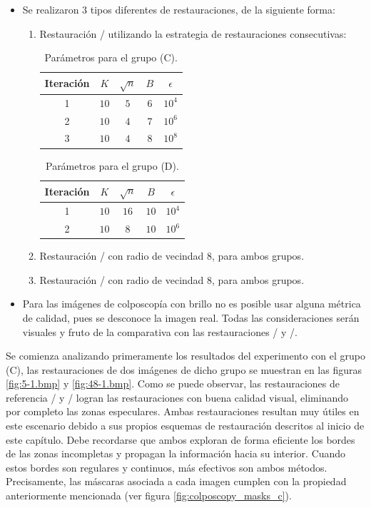 \begin{itemize}
	\item Se realizaron 3 tipos diferentes de restauraciones, de la siguiente forma:
	\begin{enumerate}
		\item Restauraci\'on \SOP/ utilizando la estrategia de restauraciones consecutivas:
		\begin{table}[H]
			\centering
			\begin{tabular}{|c|cccc|}
				\hline
				Iteraci\'on & $K$ & $\sqrt{n}$ & $B$ & $\epsilon$ \\\hline
				1 & $10$ & $5$ & $6$ & $10^4$\\
				2 & $10$ & $4$ & $7$ & $10^6$\\
				3 & $10$ & $4$ & $8$ & $10^8$\\\hline
			\end{tabular}
			\caption{Par\'ametros para el grupo (C).}
			\label{tab:params_c}
		\end{table}
		\begin{table}[H]
			\centering
			\begin{tabular}{|c|cccc|}
				\hline
				Iteraci\'on & $K$ & $\sqrt{n}$ & $B$ & $\epsilon$ \\\hline
				1 & $10$ & $16$ & $10$ & $10^4$\\
				2 & $10$ & $8$ & $10$ & $10^6$\\\hline
			\end{tabular}
			\caption{Par\'ametros para el grupo (D).}
		\end{table}
		\item Restauraci\'on \TELEA/ con radio de vecindad $8$, para ambos grupos.
		\item Restauraci\'on \NS/ con radio de vecindad $8$, para ambos grupos.
	\end{enumerate}
	\item Para las im\'agenes de colposcop\'ia con brillo no es posible usar alguna m\'etrica de calidad, pues se desconoce la imagen real. Todas las consideraciones ser\'an visuales y fruto de la comparativa con las restauraciones \TELEA/ y \NS/.  
\end{itemize}

\qquad

Se comienza analizando primeramente los resultados del experimento con el grupo (C), las restauraciones de dos im\'agenes de dicho grupo se muestran en las figuras \ref{fig:5-1.bmp} y \ref{fig:48-1.bmp}. Como se puede observar, las restauraciones de referencia \TELEA/ y \NS/ logran las restauraciones con buena calidad visual, eliminando por completo las zonas especulares. Ambas restauraciones resultan muy \'utiles en este escenario debido a sus propios esquemas de restauraci\'on descritos al inicio de este cap\'itulo. Debe recordarse que ambos exploran de forma eficiente los bordes de las zonas incompletas y propagan la información hacia su interior. Cuando estos bordes son regulares y continuos, m\'as efectivos son ambos m\'etodos. Precisamente, las m\'ascaras asociada a cada imagen cumplen con la propiedad anteriormente mencionada (ver figura \ref{fig:colposcopy_masks_c}).

